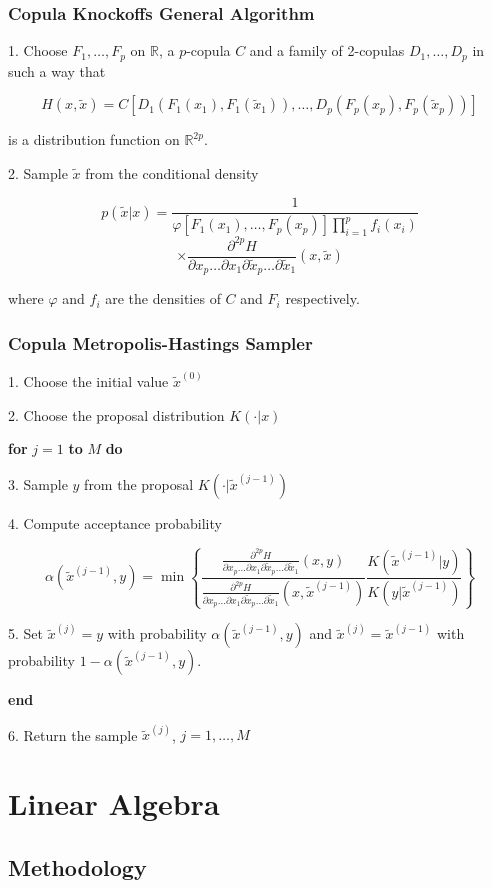 \documentclass[
	11pt, %
]{beamer}
\begin{document}
\begin{frame}
	\frametitle{Copula Knockoffs General Algorithm}
	1. Choose $F_1,\dots,F_p$ on $\mathbb{R}$, a $p$-copula $C$ and a family of 2-copulas $D_1,\dots,D_p$ in such a way that
	
	$$H(x,\tilde{x})=C\left[D_1\left(F_1(x_1),F_1(\tilde{x}_1)\right),\dots,D_p\left(F_p(x_p),F_p(\tilde{x}_p)\right)\right]$$
	
	is a distribution function on $\mathbb{R}^{2p}$.
	
	2. Sample $\tilde{x}$ from the conditional density
	
	$$p(\tilde{x}|x)=\frac{1}{\varphi[F_1(x_1),\dots,F_p(x_p)]\prod_{i=1}^p f_i(x_i)}$$ $$\times\frac{\partial^{2p}H}{\partial x_p\dots\partial x_1\partial\tilde{x}_p\dots\partial\tilde{x}_1}(x,\tilde{x})$$
	
	where $\varphi$ and $f_i$ are the densities of $C$ and $F_i$ respectively.
\end{frame}

\begin{frame}
\frametitle{Copula Metropolis-Hastings Sampler}
1. Choose the initial value $\tilde{x}^{(0)}$

2. Choose the proposal distribution $K(\cdot|x)$

	\textbf{for} $j=1$ \textbf{to} $M$ \textbf{do}
	
	3. Sample $y$ from the proposal $K(\cdot|\tilde{x}^{(j-1)})$
	
	4. Compute acceptance probability 
	
	$$\alpha(\tilde{x}^{(j-1)},y)=\min\left\{\dfrac{\frac{\partial^{2p}H}{\partial x_p\dots\partial x_1\partial\tilde{x}_p\dots\partial\tilde{x}_1}(x,y)}{\frac{\partial^{2p}H}{\partial x_p\dots\partial x_1\partial\tilde{x}_p\dots\partial\tilde{x}_1}(x,\tilde{x}^{(j-1)})}\dfrac{K(\tilde{x}^{(j-1)}|y)}{K(y|\tilde{x}^{(j-1)})}\right\}$$
	
	5. Set $\tilde{x}^{(j)}=y$ with probability $\alpha(\tilde{x}^{(j-1)},y)$ and $\tilde{x}^{(j)}=\tilde{x}^{(j-1)}$ with probability $1-\alpha(\tilde{x}^{(j-1)},y)$.
	
	\textbf{end}

6. Return the sample $\tilde{x}^{(j)}$, $j=1,\dots,M$
\end{frame}

\section{Linear Algebra}

\subsection{Methodology}
\end{document}
